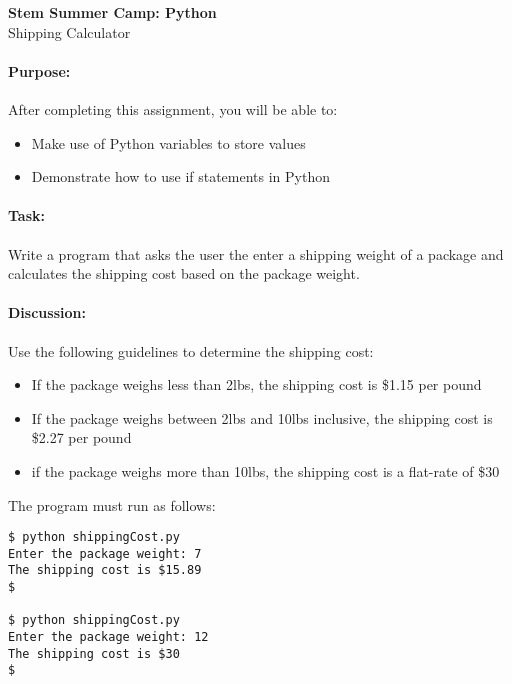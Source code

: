 \documentclass[11pt]{article}
\begin{document}
    \begin{center}

        \large\textbf{Stem Summer Camp: Python} \\
        Shipping Calculator \\

    \end{center}

    \paragraph{Purpose:} After completing this assignment, you will be
    able to:

        \begin{itemize}

            \item Make use of Python variables to store values

            \item Demonstrate how to use if statements in Python

        \end{itemize}

    \paragraph{Task:} Write a program that asks the user the enter a
    shipping weight of a package and calculates the shipping cost based
    on the package weight.
    
    \paragraph{Discussion:} Use the following guidelines to determine
    the shipping cost:

    \begin{itemize}

        \item If the package weighs less than 2lbs, the shipping cost is
            \$1.15 per pound

        \item If the package weighs between 2lbs and 10lbs inclusive,
            the shipping cost is \$2.27 per pound

        \item if the package weighs more than 10lbs, the shipping cost
            is a flat-rate of \$30

    \end{itemize}
    
    The program must run as follows:
    
    \vspace{1.5em}

\begin{verbatim}
$ python shippingCost.py
Enter the package weight: 7
The shipping cost is $15.89
$

$ python shippingCost.py
Enter the package weight: 12
The shipping cost is $30
$
\end{verbatim}
\end{document}

